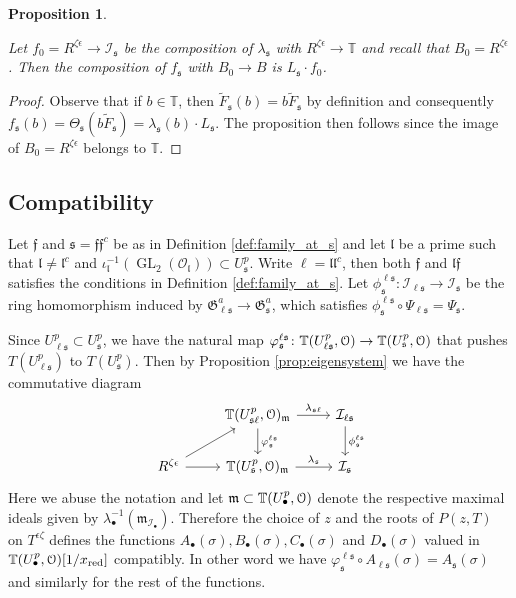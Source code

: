 \documentclass[leqno]{amsart}
\newtheorem{prop}[thm]{Proposition}
\theoremstyle{definition}
\theoremstyle{remark}
\newcommand{\oo}{\mathcal{O}}
\newcommand{\eo}{\EuScript{O}}
\DeclareMathOperator{\GL}{GL}
\newcommand{\ff}{\mathfrak{f}}
\newcommand{\fl}{\mathfrak{l}}
\newcommand{\fm}{\mathfrak{m}}
\newcommand{\fs}{\mathfrak{s}}
\newcommand{\xx}{x_\textnormal{red}}
\newcommand{\fG}{\mathfrak{G}}
\newcommand{\TT}{\mathbb{T}} %
\newcommand{\I}{\mathcal{I}} %
\begin{document}
\begin{prop}\label{prop:res_0}

Let $f_0=R^{\zeta\epsilon}\to \I_\fs$ 
be the composition of $\lambda_\fs$ with 
$R^{\zeta\epsilon}\to \TT$
and recall that $B_0=R^{\zeta\epsilon}$.
Then the composition of $f_\fs$ with
$B_0\to B$
is $L_\fs\cdot f_0$.
\end{prop}
\begin{proof}
Observe that if $b\in\TT$, then
$\tilde{F}_\fs(b)=b\tilde{F}_\fs$ by definition
and consequently 
$f_\fs(b)=\Theta_\fs(b\tilde{F}_\fs)=\lambda_{\fs}(b)\cdot L_\fs$.
The proposition then follows since the image of $B_0=R^{\zeta\epsilon}$
belongs to $\TT$.

\end{proof}










\subsection{Compatibility}

Let $\ff$ and $\fs=\ff\ff^c$ be as in 
Definition \ref{def:family_at_s}
and let $\fl$ be a prime such that $\fl\neq\fl^c$ and
$\iota_\fl^{-1}(\GL_2(\oo_\fl))\subset U_\fs^p$.
Write $\ell=\fl\fl^c$, then both $\ff$ and $\fl\ff$
satisfies the conditions in Definition \ref{def:family_at_s}.
Let $\phi^{\ell\fs}_\fs\colon \I_{\ell\fs}\to \I_\fs$
be the ring homomorphism induced by $\fG_{\ell\fs}^a\to \fG_\fs^a$,
which satisfies $\phi^{\ell\fs}_\fs\circ \Psi_{\ell\fs}=\Psi_{\fs}$.

Since $U^p_{\ell\fs}\subset U^p_{\fs}$,
we have the natural map
$\varphi^{\ell\fs}_{\fs}\colon 
\TT(U^p_{\ell\fs},\eo)\to \TT(U^p_{\fs},\eo)$
that pushes $T(U^p_{\ell\fs})$ to $T(U^p_{\fs})$.
Then by Proposition \ref{prop:eigensystem}
we have the commutative diagram
\[
\begin{tikzcd}
	& \TT(U^p_{\fs\ell},\eo)_\fm
    \arrow[d,"\varphi^{\ell\fs}_\fs"] \arrow[r,"\lambda_{\fs\ell}"]
    &\I_{\ell\fs} \arrow[d,"\phi^{\ell\fs}_\fs"]\\
	R^{\zeta\epsilon}\arrow[r]\arrow[ur]
	& \TT(U^p_\fs,\eo)_\fm \arrow[r,"\lambda_\fs"] &
    \I_\fs
\end{tikzcd}
\]
Here we abuse the notation
and let $\fm\subset \TT(U^p_\bullet,\eo)$
denote the respective maximal ideals 
given by $\lambda_\bullet^{-1}(\fm_{\I_{\bullet}})$.
Therefore the choice of $z$ and the roots of $P(z,T)$ 
on $T^{\epsilon\zeta}$ defines the functions
$A_\bullet(\sigma),B_\bullet(\sigma),
C_\bullet(\sigma)$ and $D_\bullet(\sigma)$
valued in $\TT(U^p_\bullet,\eo)[1/\xx]$ compatibly.
In other word we have
$\varphi^{\ell\fs}_\fs\circ A_{\ell\fs}(\sigma)=
A_\fs(\sigma)$ and similarly for the rest of the functions.
\end{document}
